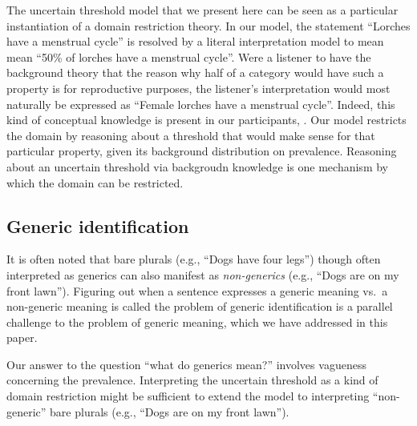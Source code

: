 \documentclass[floatsintext,doc]{apa6}
\theoremstyle{definition}
\theoremstyle{definition}
\theoremstyle{definition}
\theoremstyle{remark}
\begin{document}
The uncertain threshold model that we present here can be seen as a
particular instantiation of a domain restriction theory. In our model,
the statement \enquote{Lorches have a menstrual cycle} is resolved by a
literal interpretation model to mean mean \enquote{50\% of lorches have
a menstrual cycle}. Were a listener to have the background theory that
the reason why half of a category would have such a property is for
reproductive purposes, the listener's interpretation would most
naturally be expressed as \enquote{Female lorches have a menstrual
cycle}. Indeed, this kind of conceptual knowledge is present in our
participants, . Our model
restricts the domain by reasoning about a threshold that would make
sense for that particular property, given its background distribution on
prevalence. Reasoning about an uncertain threshold via backgroudn
knowledge is one mechanism by which the domain can be restricted.

\subsection{Generic identification}\label{generic-identification}

It is often noted that bare plurals (e.g., \enquote{Dogs have four
legs}) though often interpreted as generics can also manifest as
\emph{non-generics} (e.g., \enquote{Dogs are on my front lawn}).
Figuring out when a sentence expresses a generic meaning vs.~a
non-generic meaning is called the problem of generic identification is a
parallel challenge to the problem of generic meaning, which we have
addressed in this paper.

Our answer to the question \enquote{what do generics mean?} involves
vagueness concerning the prevalence. Interpreting the uncertain
threshold as a kind of domain restriction might be sufficient to extend
the model to interpreting \enquote{non-generic} bare plurals (e.g.,
\enquote{Dogs are on my front lawn}).
\end{document}

